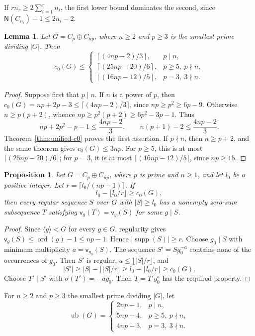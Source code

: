 \documentclass[10pt,a4paper]{amsart}
\newtheorem{lem}[thm]{Lemma}
\newtheorem{prop}[thm]{Proposition}
\theoremstyle{definition}
\theoremstyle{remark}
\numberwithin{equation}{section}
\DeclareMathOperator{\ord}{ord}
\DeclareMathOperator{\supp}{supp}
\begin{document}
If $rn_r\ge2\sum_{i=1}^r n_i$, the first lower bound dominates the second,
since $\mathsf{N}(C_{n_i})-1\le2n_i-2$.


\begin{lem}\label{lem6.1}
Let $G=C_p\oplus C_{np}$, where $n\ge2$ and $p\ge3$ is the
smallest prime dividing $|G|$. Then
\[
c_0(G)\le
\begin{cases}
\left\lceil(4np-2)/3\right\rceil,&p\mid n,\\
\left\lceil(25np-20)/6\right\rceil,&p\ge5,\ p\nmid n,\\
\left\lceil(16np-12)/5\right\rceil,&p=3,\ 3\nmid n.
\end{cases}
\]
\end{lem}

\begin{proof}
Suppose first that $p\mid n$.
If $n$ is a power of $p$, then
$c_0(G)=np+2p-3\le\lceil(4np-2)/3\rceil$, since
$np\ge p^2\ge6p-9$.
Otherwise $n\ge p(p+2)$, whence
$np\ge p^2(p+2)\ge6p^2-3p-1$. Thus
\[
np+2p^2-p-1\le\frac{4np-2}{3},
\qquad
n(p+1)-2\le\frac{4np-2}{3}.
\]
Theorem~\ref{thm:unified-c0} proves the first assertion.
If $p\nmid n$, then $n\ge p+2$, and the same theorem gives
$c_0(G)\le3np$.
For $p\ge5$, this is at most $\lceil(25np-20)/6\rceil$;
for $p=3$, it is at most $\lceil(16np-12)/5\rceil$,
since $np\ge15$.
\end{proof}

\begin{prop}\label{prop:regular-N-reduction}
Let $G=C_p\oplus C_{np}$, where $p$ is prime and $n\ge1$, and let $l_0$ be a positive integer.
Let $r=\lceil l_0/(np-1)\rceil$. If
\[
l_0-\lfloor l_0/r\rfloor\ge c_0(G),
\]
then every regular sequence $S$ over $G$ with $|S|\ge l_0$
has a nonempty zero-sum subsequence $T$ satisfying
$\mathsf v_g(T)=\mathsf v_g(S)$ for some $g\mid S$.
\end{prop}

\begin{proof}
Since $\langle g\rangle<G$ for every $g\in G$,
regularity gives $\mathsf v_g(S)\le\ord(g)-1\le np-1$.
Hence $|\supp(S)|\ge r$.
Choose $g_0\mid S$ with minimum multiplicity
$a=\mathsf v_{g_0}(S)$. The sequence $S'=Sg_0^{-a}$
contains none of the occurrences of $g_0$.
Then $S'$ is regular, $a\le\lfloor |S|/r\rfloor$, and
\[
|S'|\ge |S|-\lfloor |S|/r\rfloor
\ge l_0-\lfloor l_0/r\rfloor\ge c_0(G).
\]
Choose $T'\mid S'$ with $\sigma(T')=-ag_0$.
Then $T=T'g_0^a$ has the required property.
\end{proof}

For $n\ge2$ and $p\ge3$ the smallest prime dividing $|G|$, let
\[
\operatorname{ub}(G)=\begin{cases}
2np-1,&p\mid n,\\
5np-4,&p\ge5,\ p\nmid n,\\
4np-3,&p=3,\ 3\nmid n.
\end{cases}
\]
\end{document}
